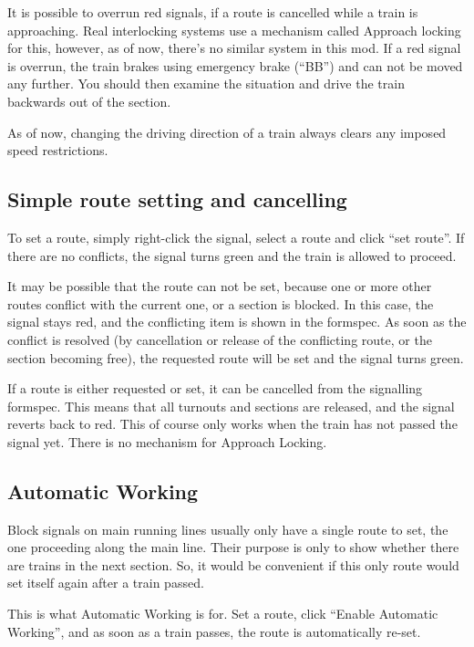 \documentclass[english]{paper}
\begin{document}
It is possible to overrun red signals, if a route is cancelled while
a train is approaching. Real interlocking systems use a mechanism
called Approach locking for this, however, as of now, there's no similar
system in this mod. If a red signal is overrun, the train brakes using
emergency brake (``BB'') and can not be moved any further. You should
then examine the situation and drive the train backwards out of the
section.

As of now, changing the driving direction of a train always clears
any imposed speed restrictions.

\subsection{Simple route setting and cancelling}

To set a route, simply right-click the signal, select a route and
click ``set route''. If there are no conflicts, the signal turns
green and the train is allowed to proceed.

It may be possible that the route can not be set, because one or more
other routes conflict with the current one, or a section is blocked.
In this case, the signal stays red, and the conflicting item is shown
in the formspec. As soon as the conflict is resolved (by cancellation
or release of the conflicting route, or the section becoming free),
the requested route will be set and the signal turns green.

If a route is either requested or set, it can be cancelled from the
signalling formspec. This means that all turnouts and sections are
released, and the signal reverts back to red. This of course only
works when the train has not passed the signal yet. There is no mechanism
for Approach Locking.

\subsection{Automatic Working}

Block signals on main running lines usually only have a single route
to set, the one proceeding along the main line. Their purpose is only
to show whether there are trains in the next section. So, it would
be convenient if this only route would set itself again after a train
passed.

This is what Automatic Working is for. Set a route, click ``Enable
Automatic Working'', and as soon as a train passes, the route is
automatically re-set.
\end{document}
